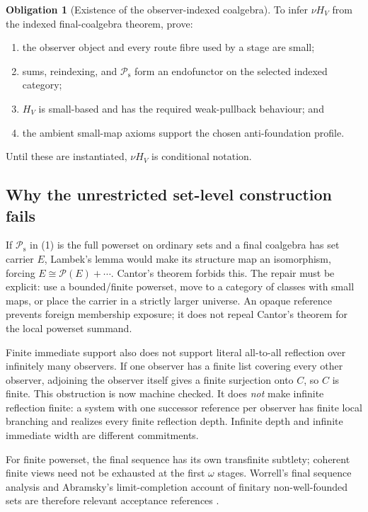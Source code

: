 \documentclass[11pt]{article}
\theoremstyle{definition}
\newtheorem{obligation}[theorem]{Obligation}
\theoremstyle{remark}
\newcommand{\Ps}{\mathcal{P}_{\mathrm{s}}}
\begin{document}
\begin{obligation}[Existence of the observer-indexed coalgebra]
To infer $\nu H_V$ from the indexed final-coalgebra theorem, prove:
\begin{enumerate}[label=(\roman*)]
\item the observer object and every route fibre used by a stage are small;
\item sums, reindexing, and $\Ps$ form an endofunctor on the selected indexed
  category;
\item $H_V$ is small-based and has the required weak-pullback behaviour; and
\item the ambient small-map axioms support the chosen anti-foundation profile.
\end{enumerate}
Until these are instantiated, $\nu H_V$ is conditional notation.
\end{obligation}

\subsection{Why the unrestricted set-level construction fails}

If $\Ps$ in (1) is the full powerset on ordinary sets and a final coalgebra has
set carrier $E$, Lambek's lemma would make its structure map an isomorphism,
forcing $E\cong\mathcal P(E)+\cdots$.  Cantor's theorem forbids this.  The repair
must be explicit: use a bounded/finite powerset, move to a category of classes
with small maps, or place the carrier in a strictly larger universe.  An opaque
reference prevents foreign membership exposure; it does not repeal Cantor's
theorem for the local powerset summand.

Finite immediate support also does not support literal all-to-all reflection over
infinitely many observers.  If one observer has a finite list covering every
other observer, adjoining the observer itself gives a finite surjection onto
$C$, so $C$ is finite.  This obstruction is now machine checked.  It does
\emph{not} make infinite reflection finite: a system with one successor reference
per observer has finite local branching and realizes every finite reflection
depth.  Infinite depth and infinite immediate width are different commitments.

For finite powerset, the final sequence has its own transfinite subtlety; coherent
finite views need not be exhausted at the first $\omega$ stages.  Worrell's final
sequence analysis and Abramsky's limit-completion account of finitary
non-well-founded sets are therefore relevant acceptance references
\cite{WorrellFinalSequence,AbramskyFinitary}.
\end{document}
